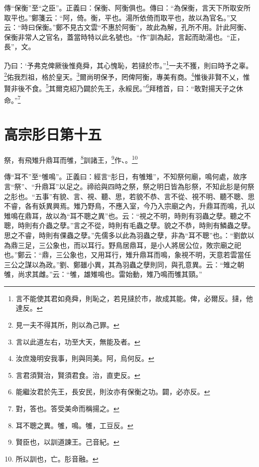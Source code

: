 {\noindent\zhuan{}\fzbyks 傳“保衡”至“之臣”。正義曰：保衡、阿衡俱也。傳曰：“為保衡，言天下所取安所取平也。”鄭箋云：“阿，倚。衡，平也。湯所依倚而取平也，故以為官名。”又云：“時曰保衡。”鄭不見古文雲“不惠於阿衡”，故此為解，孔所不用。計此阿衡、保衡非常人之官名，蓋當時特以此名號也。“作”訓為起，言起而助湯也。“正，長”，文。 \par}

乃曰：‘予弗克俾厥後惟堯舜，其心愧恥，若撻於市。”\footnote{言不能使其君如堯舜，則恥之，若見撻於市，故成其能。俾，必爾反。撻，他達反。}一夫不獲，則曰時予之辜。\footnote{見一夫不得其所，則以為己罪。}佑我烈祖，格於皇天。\footnote{言以此道左右，功至大天，無能及者。}爾尚明保予，罔俾阿衡，專美有商。\footnote{汝庶幾明安我事，則與同美。阿，烏何反。}惟後非賢不乂，惟賢非後不食。\footnote{言君須賢治，賢須君食。治，直吏反。}其爾克紹乃闢於先王，永綏民。”\footnote{能繼汝君於先王，長安民，則汝亦有保衡之功。闢，必亦反。}拜稽首，曰：“敢對揚天子之休命。”\footnote{對，答也。答受美命而稱揚之。}

\section{高宗肜日第十五}


祭，有飛雉升鼎耳而雊，\footnote{耳不聰之異。雊，鳴。雊，工豆反。}訓諸王，\footnote{賢臣也，以訓道諫王。己音紀。}作、。\footnote{所以訓也，亡。肜音融。}


{\noindent\zhuan{}\fzbyks 傳“耳不”至“雊鳴”。正義曰：經言“肜日，有雊雉”，不知祭何廟，鳴何處，故序言“祭”、“升鼎耳”以足之。禘祫與四時之祭，祭之明日皆為肜祭，不知此肜是何祭之肜也。“五事”有貌、言、視、聽、思，若貌不恭、言不從、視不明、聽不聰、思不睿，各有妖異興焉。雉乃野鳥，不應入室，今乃入宗廟之內，升鼎耳而鳴，孔以雉鳴在鼎耳，故以為“耳不聰之異”也。云：“視之不明，時則有羽蟲之孽。聽之不聰，時則有介蟲之孽。”言之不從，時則有毛蟲之孽。貌之不恭，時則有鱗蟲之孽。思之不睿，時則有倮蟲之孽。”先儒多以此為羽蟲之孽，非為“耳不聰”也。：“劉歆以為鼎三足，三公象也，而以耳行。野鳥居鼎耳，是小人將居公位，敗宗廟之祀也。”鄭云：“鼎，三公象也，又用耳行，雉升鼎耳而鳴，象視不明，天意若雲當任三公之謀以為政。”劉、鄭雖小異，其為羽蟲之孽則同，與孔意異。云：“雉之朝雊，尚求其雌。”云：“雊，雄雉鳴也。雷始動，雉乃鳴而雊其頸。” \par}

